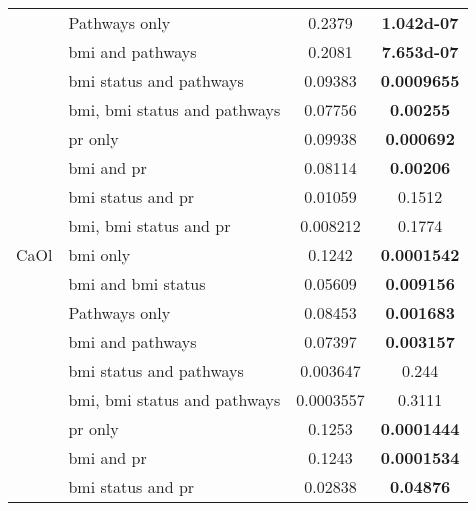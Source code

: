 \begin{ThreePartTable}
\begin{longtable}{llcc}
		                                  & Pathways only                            & 0.2379     & \bfseries \num{1.042d-07} \\
		                                  & \gls{bmi} and pathways                   & 0.2081     & \bfseries \num{7.653d-07} \\
		                                  & \gls{bmi} status and pathways            & 0.09383    & \bfseries 0.0009655 \\
		                                  & \gls{bmi}, \gls{bmi} status and pathways & 0.07756    & \bfseries 0.00255   \\
		                                  & \gls{pr} only                            & 0.09938    & \bfseries 0.000692  \\
		                                  & \gls{bmi} and \gls{pr}                   & 0.08114    & \bfseries 0.00206   \\
		                                  & \gls{bmi} status and \gls{pr}            & 0.01059    & 0.1512    \\
		                                  & \gls{bmi}, \gls{bmi} status and \gls{pr} & 0.008212   & 0.1774    \\
				\hline
				\rule{0pt}{2.25ex}CaOl    & \gls{bmi} only                           & 0.1242     & \bfseries 0.0001542 \\
		                                  & \gls{bmi} and \gls{bmi} status           & 0.05609    & \bfseries 0.009156  \\
		                                  & Pathways only                            & 0.08453    & \bfseries 0.001683  \\
		                                  & \gls{bmi} and pathways                   & 0.07397    & \bfseries 0.003157  \\
		                                  & \gls{bmi} status and pathways            & 0.003647   & 0.244     \\
		                                  & \gls{bmi}, \gls{bmi} status and pathways & 0.0003557  & 0.3111    \\
		                                  & \gls{pr} only                            & 0.1253     & \bfseries 0.0001444 \\
		                                  & \gls{bmi} and \gls{pr}                   & 0.1243     & \bfseries 0.0001534 \\
		                                  & \gls{bmi} status and \gls{pr}            & 0.02838    & \bfseries 0.04876   \\

\end{longtable}
\end{ThreePartTable}
